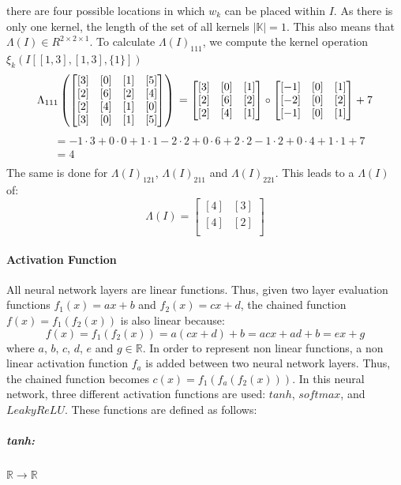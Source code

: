 \documentclass[12pt]{article}
\begin{document}
there are four possible locations in which \(w_k\) can be placed within \(I\). As there is only one kernel, the length of the set of all kernels \(|\mathbb{K}| = 1\). This also means that \(\Lambda(I) \in R^{2 \times 2 \times 1}\). To calculate \(\Lambda(I)_{111}\), we compute the kernel operation \(\xi_k(I[[1,3],[1,3],\{1\}])\)
\begin{equation}
\label{eq:conv:eg}
\Lambda_{111}
\left(\begin{bmatrix}
[3] & [0] & [1] & [5] \\
[2] & [6] & [2] & [4] \\
[2] & [4] & [1] & [0] \\
[3] & [0] & [1] & [5] \\
\end{bmatrix}\right)\\
 = \begin{bmatrix}
[3] & [0] & [1] \\
[2] & [6] & [2] \\
[2] & [4] & [1] \\
\end{bmatrix} \circ 
\begin{bmatrix}
[-1] & [0] & [1] \\
[-2] & [0] & [2] \\
[-1] & [0] & [1]
\end{bmatrix} + 7
\end{equation}
\begin{align*}
&= -1 \cdot 3 + 0 \cdot 0 + 1 \cdot 1 - 2 \cdot 2 + 0 \cdot 6 + 2 \cdot 2 -1 \cdot 2 + 0 \cdot 4 + 1 \cdot 1 + 7\\
&= 4\\
\end{align*}
The same is done for \(\Lambda(I)_{121}\), \(\Lambda(I)_{211}\) and \(\Lambda(I)_{221}\). This leads to a \(\Lambda(I)\) of:
\[
\Lambda(I) = \begin{bmatrix}
[4] & [3] \\
[4] & [2] \\
\end{bmatrix}
\]
\paragraph{Activation Function}
All neural network layers are linear functions. Thus, given two layer evaluation functions \(f_1(x) = ax + b\) and \(f_2(x) = cx + d\), the chained function \(f(x) = f_1(f_2(x))\) is also linear because:
\begin{equation}
\label{eq:proofOfLinearity}
f(x) = f_1(f_2(x)) = a(cx + d) + b = acx + ad + b = ex + g
\end{equation}
where \(a\),  \(b\), \(c\), \(d\), \(e\) and \(g \in \mathbb R\). In order to represent non linear functions, a non linear activation function \(f_a\) is added between two neural network layers. Thus, the chained function becomes \(c(x) = f_1(f_a(f_2(x)))\). In this neural network, three different activation functions are used: \(tanh\), \(softmax\), and \(LeakyReLU\). These functions are defined as follows:
\subparagraph*{tanh:}\(\mathbb{R}\to \mathbb{R}\)
\end{document}
